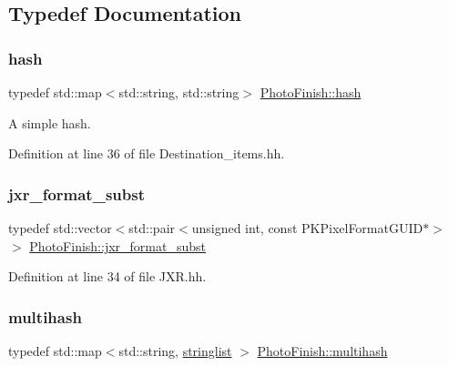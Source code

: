 \subsection{Typedef Documentation}
\mbox{\label{namespace_photo_finish_a5cfd59b3790dc7319dde2b4c0f96ac5a}} 
\subsubsection{\texorpdfstring{hash}{hash}}
{\footnotesize\ttfamily typedef std\+::map$<$std\+::string, std\+::string$>$ \hyperlink{namespace_photo_finish_a5cfd59b3790dc7319dde2b4c0f96ac5a}{Photo\+Finish\+::hash}}



A simple hash. 



Definition at line 36 of file Destination\+\_\+items.\+hh.

\mbox{\label{namespace_photo_finish_a230739f3d4e738115f80e9a77e225959}} 
\subsubsection{\texorpdfstring{jxr\+\_\+format\+\_\+subst}{jxr\_format\_subst}}
{\footnotesize\ttfamily typedef std\+::vector$<$std\+::pair$<$unsigned int, const P\+K\+Pixel\+Format\+G\+U\+ID$\ast$$>$ $>$ \hyperlink{namespace_photo_finish_a230739f3d4e738115f80e9a77e225959}{Photo\+Finish\+::jxr\+\_\+format\+\_\+subst}}



Definition at line 34 of file J\+X\+R.\+hh.

\mbox{\label{namespace_photo_finish_a6f41796f162687538b7da5c7a95e2d18}} 
\subsubsection{\texorpdfstring{multihash}{multihash}}
{\footnotesize\ttfamily typedef std\+::map$<$std\+::string, \hyperlink{namespace_photo_finish_a5b181b4da2f4f053ba4db6273f62310d}{stringlist} $>$ \hyperlink{namespace_photo_finish_a6f41796f162687538b7da5c7a95e2d18}{Photo\+Finish\+::multihash}}




